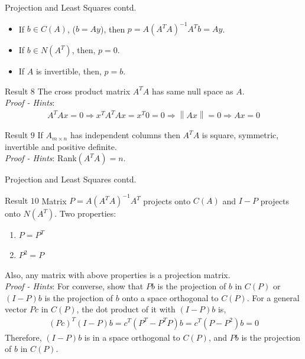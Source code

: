 \documentclass{beamer}
\begin{document}
\begin{frame}{Projection and Least Squares contd.}
\begin{itemize}
    \item If $b \in C(A)$, ($b=Ay$), then $p = A(A^TA)^{-1}A^Tb = Ay$.
    \item If $b \in N(A^T)$, then, $p = 0$.
    \item If $A$ is invertible, then, $p = b$.
\end{itemize}
\begin{block}{Result $8$}
The cross product matrix $A^TA$ has same null space as $A$.\\
\textit{Proof - Hints}:
\begin{align*}
    A^TAx = 0 \Rightarrow x^TA^TAx = x^T0 = 0 \Rightarrow \left\|Ax\right\| = 0 \Rightarrow Ax = 0
\end{align*}
\end{block}
\begin{block}{Result $9$}
If $A_{m\times n}$ has independent columns then $A^TA$ is square, symmetric,  invertible and positive definite.\\
\textit{Proof - Hints}: Rank$(A^TA) = n$.
\end{block}
\end{frame}

\begin{frame}{Projection and Least Squares contd.}
\begin{block}{Result $10$}
Matrix $P = A(A^TA)^{-1}A^T$ projects onto $C(A)$ and $I-P$ projects onto $N(A^T)$. Two properties:
\begin{enumerate}
    \item $P = P^T$
    \item $P^2 = P$
\end{enumerate}
Also, any matrix with above properties is a projection matrix.\\
\textit{Proof - Hints}: For converse, show that $Pb$ is the projection of $b$ in $C(P)$ or $(I-P)b$ is the projection of $b$ onto a space orthogonal to $C(P)$. For a general vector $Pc$ in $C(P)$, the dot product of it with $(I-P)b$ is,
\begin{align*}
    (Pc)^T(I-P)b = c^T(P^T - P^TP)b = c^T(P - P^2)b = 0
\end{align*}
Therefore, $(I-P)b$ is in a space orthogonal to $C(P)$, and $Pb$ is the projection of $b$ in $C(P)$.
\end{block}
\end{frame}
\end{document}
